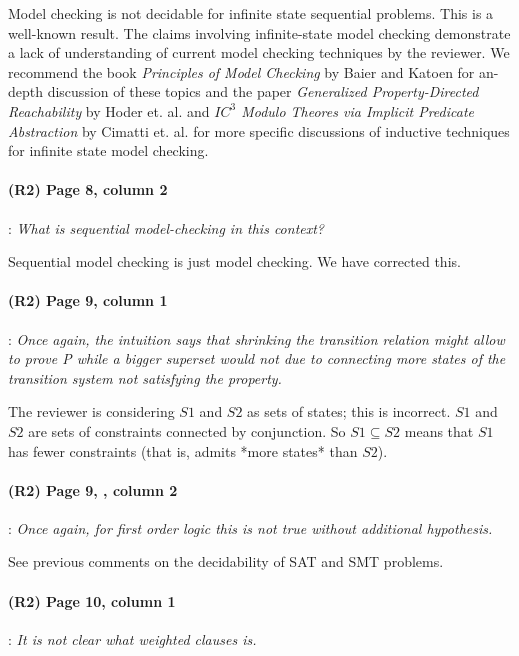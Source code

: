 \documentclass{article}
\begin{document}
Model checking is not decidable for infinite state sequential problems.  This is a well-known result.  The claims involving infinite-state model checking demonstrate a lack of understanding of current model checking techniques by the reviewer.  We recommend the book {\em Principles of Model Checking} by Baier and Katoen for an-depth discussion of these topics and the paper {\em Generalized Property-Directed Reachability} by Hoder et. al.  and {\em $IC^{3}$ Modulo Theores via Implicit Predicate Abstraction} by Cimatti et. al. for more specific discussions of inductive techniques for infinite state model checking.


\paragraph{(R2) Page 8, column 2}: \textit{What is sequential model-checking in this context?}
\vspace{0.05in}


\noindent Sequential model checking is just model checking. We have corrected this.


\paragraph{(R2) Page 9, column 1}: \textit{Once again, the intuition says that shrinking the transition relation might allow to prove P while a bigger superset would not due to connecting more states of the transition system not satisfying the property.}
\vspace{0.05in}

\noindent The reviewer is considering $S1$ and $S2$ as sets of states; this is incorrect.  $S1$ and $S2$ are sets of constraints connected by conjunction.  So $S1 \subseteq S2$ means that $S1$ has fewer constraints (that is, admits *more states* than $S2$).

\paragraph{(R2) Page 9, , column 2}: \textit{Once again, for first order logic this is not true without additional hypothesis.}
\vspace{0.05in}

\noindent See previous comments on the decidability of SAT and SMT problems.

\paragraph{(R2) Page 10, column 1}: \textit{It is not clear what weighted clauses is.}
\vspace{0.05in}
\end{document}
